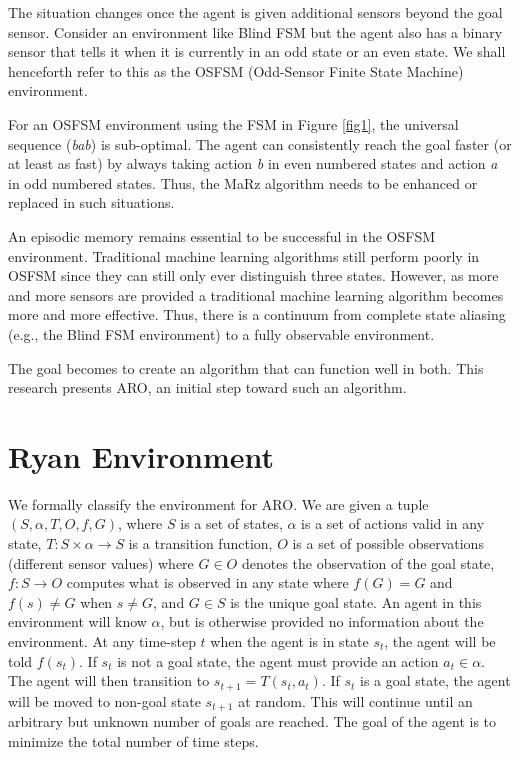 \documentclass[letterpaper]{article} %
\begin{document}

The situation changes once the agent is given additional sensors
beyond the goal sensor.  Consider an environment like Blind FSM but
the agent also has a binary sensor that tells it when it is currently
in an odd state or an even state.  We shall henceforth refer to this
as the OSFSM (Odd-Sensor Finite State Machine) environment.

For an OSFSM environment using the FSM in Figure \ref{fig1}, the
universal sequence (\textit{bab}) is sub-optimal.  The agent can
consistently reach the goal faster (or at least as fast) by always
taking action \textit{b} in even numbered states and action \textit{a}
in odd numbered states.  Thus, the MaRz algorithm needs to be enhanced
or replaced in such situations.

An episodic memory remains essential to be successful in the OSFSM
environment.  Traditional machine learning algorithms still perform
poorly in OSFSM since they can still only ever distinguish three
states.  However, as more and more sensors are provided a traditional
machine learning algorithm becomes more and more effective.  Thus,
there is a continuum from complete state aliasing (e.g., the Blind FSM
environment) to a fully observable environment.

The goal becomes to create an algorithm that can function well in
both.  This research presents ARO, an initial step toward such an
algorithm.

\section{Ryan Environment}

We formally classify the environment for ARO. We are given a tuple $(S, \alpha, T, O, f, G)$, where $S$ is a set of states, $\alpha$ is a set of actions valid in any state, $T: S \times \alpha \rightarrow S$ is a transition function, $O$ is a set of possible observations (different sensor values) where $G \in O$ denotes the observation of the goal state, $f: S \rightarrow O$ computes what is observed in any state where $f(G) = G$ and $f(s) \neq G$ when $s \neq G$, and $G \in S$ is the unique goal state. An agent in this environment will know $\alpha$, but is otherwise provided no information about the environment. At any time-step $t$ when the agent is in state $s_t$, the agent will be told $f(s_t)$. If $s_t$ is not a goal state, the agent must provide an action $a_t \in \alpha$. The agent will then transition to $s_{t+1} = T(s_t, a_t)$. If $s_t$ is a goal state, the agent will be moved to non-goal state $s_{t+1}$ at random. This will continue until an arbitrary but unknown number of goals are reached. The goal of the agent is to minimize the total number of time steps.
\end{document}
